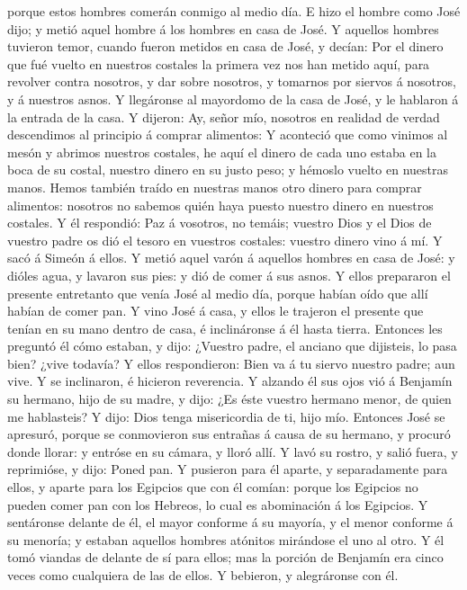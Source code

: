 porque estos hombres comerán conmigo al medio día.  E hizo
el hombre como José dijo; y metió aquel hombre á los hombres en casa de
José.  Y aquellos hombres tuvieron temor, cuando fueron
metidos en casa de José, y decían: Por el dinero que fué vuelto en
nuestros costales la primera vez nos han metido aquí, para revolver
contra nosotros, y dar sobre nosotros, y tomarnos por siervos á
nosotros, y á nuestros asnos.  Y llegáronse al mayordomo de
la casa de José, y le hablaron á la entrada de la casa.  Y
dijeron: Ay, señor mío, nosotros en realidad de verdad descendimos al
principio á comprar alimentos:  Y aconteció que como
vinimos al mesón y abrimos nuestros costales, he aquí el dinero de cada
uno estaba en la boca de su costal, nuestro dinero en su justo peso; y
hémoslo vuelto en nuestras manos.  Hemos también traído en
nuestras manos otro dinero para comprar alimentos: nosotros no sabemos
quién haya puesto nuestro dinero en nuestros costales.  Y
él respondió: Paz á vosotros, no temáis; vuestro Dios y el Dios de
vuestro padre os dió el tesoro en vuestros costales: vuestro dinero vino
á mí. Y sacó á Simeón á ellos.  Y metió aquel varón á
aquellos hombres en casa de José: y dióles agua, y lavaron sus pies: y
dió de comer á sus asnos.  Y ellos prepararon el presente
entretanto que venía José al medio día, porque habían oído que allí
habían de comer pan.  Y vino José á casa, y ellos le
trajeron el presente que tenían en su mano dentro de casa, é
inclináronse á él hasta tierra.  Entonces les preguntó él
cómo estaban, y dijo: ¿Vuestro padre, el anciano que dijisteis, lo pasa
bien? ¿vive todavía?  Y ellos respondieron: Bien va á tu
siervo nuestro padre; aun vive. Y se inclinaron, é hicieron reverencia.
 Y alzando él sus ojos vió á Benjamín su hermano, hijo de
su madre, y dijo: ¿Es éste vuestro hermano menor, de quien me
hablasteis? Y dijo: Dios tenga misericordia de ti, hijo mío.
 Entonces José se apresuró, porque se conmovieron sus
entrañas á causa de su hermano, y procuró donde llorar: y entróse en su
cámara, y lloró allí.  Y lavó su rostro, y salió fuera, y
reprimióse, y dijo: Poned pan.  Y pusieron para él aparte,
y separadamente para ellos, y aparte para los Egipcios que con él
comían: porque los Egipcios no pueden comer pan con los Hebreos, lo cual
es abominación á los Egipcios.  Y sentáronse delante de él,
el mayor conforme á su mayoría, y el menor conforme á su menoría; y
estaban aquellos hombres atónitos mirándose el uno al otro.
 Y él tomó viandas de delante de sí para ellos; mas la
porción de Benjamín era cinco veces como cualquiera de las de ellos. Y
bebieron, y alegráronse con él.

